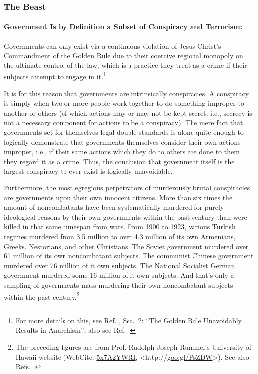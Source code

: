 \documentclass[letterpaper,12pt]{article}
\newcommand{\dsc}{\discretionary{}{}{}}
\begin{document}
\subsubsection{The Beast}
\label{subsubsec:TheBeast}

\paragraph{Government Is by Definition a Subset of Conspiracy and Terrorism:}
\label{parag:GovernmentIsSubsetOfConspiracyTerrorism}

Governments can only exist via a continuous violation of Jesus Christ's Commandment of the Golden Rule due to their coercive regional monopoly on the ultimate control of the law, which is a practice they treat as a crime if their subjects attempt to engage in it.\footnote{For more details on this, see Ref. , Sec.~2: ``The Golden Rule Unavoidably Results in Anarchism''; also see Ref. .}

It is for this reason that governments are intrinsically conspiracies. A conspiracy is simply when two or more people work together to do something improper to another or others (of which actions may or may not be kept secret, i.e., secrecy is not a necessary component for actions to be a conspiracy). The mere fact that governments set for themselves legal double-standards is alone quite enough to logically demonstrate that governments themselves consider their own actions improper, i.e., if their same actions which they do to others are done to them they regard it as a crime. Thus, the conclusion that government itself is the largest conspiracy to ever exist is logically unavoidable.

Furthermore, the most egregious perpetrators of murderously brutal conspiracies are governments upon their own innocent citizens. More than six times the amount of noncombatants have been systematically murdered for purely ideological reasons by their own governments within the past century than were killed in that same timespan from wars. From 1900 to 1923, various Turkish regimes murdered from 3.5 million to over 4.3 million of its own Armenians, Greeks, Nestorians, and other Christians. The Soviet government murdered over 61 million of its own noncombatant subjects. The communist Chinese government murdered over 76 million of it own subjects. The National Socialist German government murdered some 16 million of it own subjects. And that's only a sampling of governments mass-murdering their own noncombatant subjects within the past century.\footnote{\label{foot:GovernmentMassMurder}The preceding figures are from Prof. Rudolph Joseph Rummel's University of Hawaii website (WebCite: \href{http://www.webcitation.org/5x7A2YWRI}{5x7A2YWRI}, \textless http://\dsc \href{http://goo.gl/PsZDW}{goo.gl/\dsc PsZDW}\textgreater ). See also Refs. .}
\end{document}
